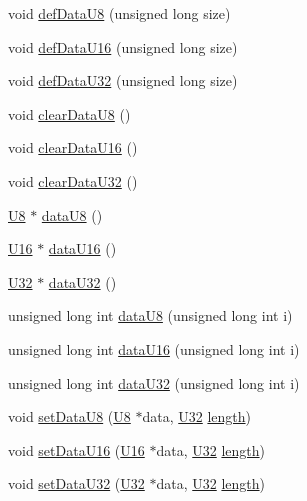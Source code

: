 \begin{DoxyCompactItemize}
\item 
void \hyperlink{classIOdata_a80bb230b61062b447db5832e43bf7b44}{def\+Data\+U8} (unsigned long size)
\item 
void \hyperlink{classIOdata_a9e37c736d6dfb5223ed45786fad403da}{def\+Data\+U16} (unsigned long size)
\item 
void \hyperlink{classIOdata_a78e50aa4a6c967cba195e77fe911a8c3}{def\+Data\+U32} (unsigned long size)
\item 
void \hyperlink{classIOdata_a9bc3ea0458ea6d13bd751ac4c80a4be6}{clear\+Data\+U8} ()
\item 
void \hyperlink{classIOdata_a13016f489aba6e80cd7be53224c3e8ab}{clear\+Data\+U16} ()
\item 
void \hyperlink{classIOdata_a848de1b6e7b7207dbb53c102a4d911a9}{clear\+Data\+U32} ()
\item 
\hyperlink{classIOdata_a18d1354b7cdaf0f8a8001fdbb3ced418}{U8} $\ast$ \hyperlink{classIOdata_a75e9c318dbac3a39402179070943d4bc}{data\+U8} ()
\item 
\hyperlink{classIOdata_a1eb45b348534a7c19a4a99b746e693ff}{U16} $\ast$ \hyperlink{classIOdata_a8d8528b731c6cf117f8c5b9b2473390c}{data\+U16} ()
\item 
\hyperlink{classIOdata_a96fb57f5fcd87b708743abd3c86a5198}{U32} $\ast$ \hyperlink{classIOdata_ab0e3cd09f46c1c3712f797116f6da074}{data\+U32} ()
\item 
unsigned long int \hyperlink{classIOdata_a9c7cc68c435e1b22dcdac7c17d186e63}{data\+U8} (unsigned long int i)
\item 
unsigned long int \hyperlink{classIOdata_a32e3bb958cb6babcb928d403fea9f171}{data\+U16} (unsigned long int i)
\item 
unsigned long int \hyperlink{classIOdata_a4ce3bcd54206b1a2149e67cb45dee922}{data\+U32} (unsigned long int i)
\item 
void \hyperlink{classIOdata_afece89b7035f6eec001cd397f07c062d}{set\+Data\+U8} (\hyperlink{classIOdata_a18d1354b7cdaf0f8a8001fdbb3ced418}{U8} $\ast$data, \hyperlink{classIOdata_a96fb57f5fcd87b708743abd3c86a5198}{U32} \hyperlink{classIOdata_abb40e71ce0290832a24857b4a1e7b1a3}{length})
\item 
void \hyperlink{classIOdata_a1796a65cbd8c4326e80d662034ee5e39}{set\+Data\+U16} (\hyperlink{classIOdata_a1eb45b348534a7c19a4a99b746e693ff}{U16} $\ast$data, \hyperlink{classIOdata_a96fb57f5fcd87b708743abd3c86a5198}{U32} \hyperlink{classIOdata_abb40e71ce0290832a24857b4a1e7b1a3}{length})
\item 
void \hyperlink{classIOdata_a408b62ac645630c645ae670691f6459f}{set\+Data\+U32} (\hyperlink{classIOdata_a96fb57f5fcd87b708743abd3c86a5198}{U32} $\ast$data, \hyperlink{classIOdata_a96fb57f5fcd87b708743abd3c86a5198}{U32} \hyperlink{classIOdata_abb40e71ce0290832a24857b4a1e7b1a3}{length})

\end{DoxyCompactItemize}
